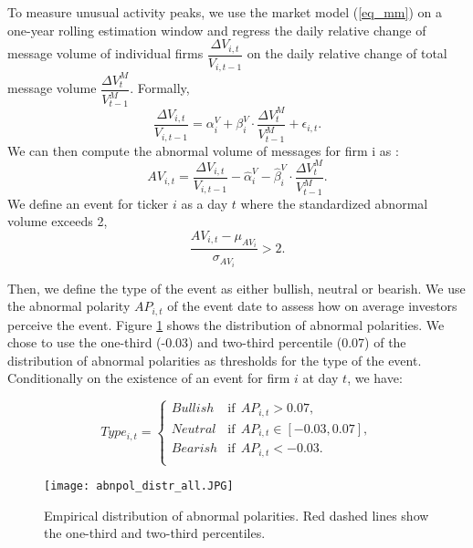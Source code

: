 To measure unusual activity peaks, we use the market model (\ref{eq_mm}) on a one-year rolling estimation window and regress the daily relative change of message volume of individual firms $\dfrac{\Delta V_{i,t}}{V_{i,t-1}}$ on the daily relative change of total message volume $\dfrac{\Delta V_t^M}{V_{t-1}^M}$. Formally,
\[     \dfrac{\Delta V_{i,t}}{V_{i,t-1}} = \alpha_i^V + \beta_i^V \cdot \dfrac{\Delta V_t^M}{V_{t-1}^M} + \epsilon_{i,t}.\]
We can then compute the abnormal volume of messages for firm i as : 
\[     AV_{i,t} = \dfrac{\Delta V_{i,t}}{V_{i,t-1}} - \hat{\alpha}_i^V - \hat{\beta}_i^V \cdot \dfrac{\Delta V_t^M}{V_{t-1}^M}. \]
We define an event for ticker $i$ as a day $t$ where the standardized abnormal volume exceeds 2, 
\[   \dfrac{AV_{i,t} - \mu_{AV_i}}{\sigma_{AV_i}} > 2.\]





Then, we define the type of the event as either bullish, neutral or bearish. We use the abnormal polarity $AP_{i,t}$ of the event date to assess how on average investors perceive the event. Figure \ref{fig:abnpol_all} shows the distribution of abnormal polarities. We chose to use the one-third (-0.03) and two-third percentile (0.07) of the distribution of abnormal polarities as thresholds for the type of the event. Conditionally on the existence of an event for firm $i$ at day $t$, we have:

\[     Type_{i,t}= \begin{cases}
      Bullish  & \text{if}\ \ AP_{i,t}> 0.07, \\
      Neutral  & \text{if}\ \ AP_{i,t} \in [-0.03, 0.07], \\
      Bearish  & \text{if}\ \ AP_{i,t} < -0.03. \\
\end{cases} \]


\begin{figure}[h]
    \centering
    \texttt{[image: abnpol\_distr\_all.JPG]}
    \caption{Empirical distribution of abnormal polarities. Red dashed lines show the one-third and two-third percentiles.}
    \label{fig:abnpol_all}
\end{figure}


